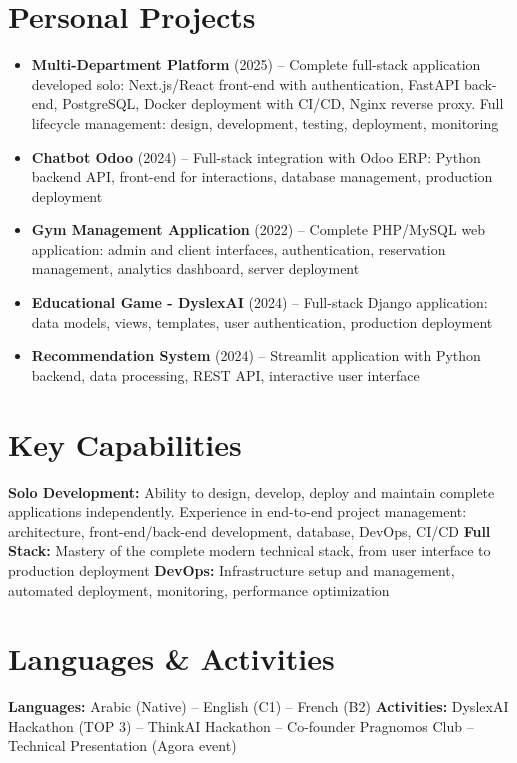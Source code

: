 \documentclass[10pt,a4paper]{article}
\begin{document}
\section*{Personal Projects}
\begin{itemize}
    \item \textbf{Multi-Department Platform} (2025) -- Complete full-stack application developed solo: Next.js/React front-end with authentication, FastAPI back-end, PostgreSQL, Docker deployment with CI/CD, Nginx reverse proxy. Full lifecycle management: design, development, testing, deployment, monitoring
    \item \textbf{Chatbot Odoo} (2024) -- Full-stack integration with Odoo ERP: Python backend API, front-end for interactions, database management, production deployment
    \item \textbf{Gym Management Application} (2022) -- Complete PHP/MySQL web application: admin and client interfaces, authentication, reservation management, analytics dashboard, server deployment
    \item \textbf{Educational Game - DyslexAI} (2024) -- Full-stack Django application: data models, views, templates, user authentication, production deployment
    \item \textbf{Recommendation System} (2024) -- Streamlit application with Python backend, data processing, REST API, interactive user interface
\end{itemize}

\section*{Key Capabilities}
\textbf{Solo Development:} Ability to design, develop, deploy and maintain complete applications independently. Experience in end-to-end project management: architecture, front-end/back-end development, database, DevOps, CI/CD \quad
\textbf{Full Stack:} Mastery of the complete modern technical stack, from user interface to production deployment \quad
\textbf{DevOps:} Infrastructure setup and management, automated deployment, monitoring, performance optimization

\section*{Languages \& Activities}
\textbf{Languages:} Arabic (Native) -- English (C1) -- French (B2) \quad
\textbf{Activities:} DyslexAI Hackathon (TOP 3) -- ThinkAI Hackathon -- Co-founder Pragnomos Club -- Technical Presentation (Agora event)
\end{document}
